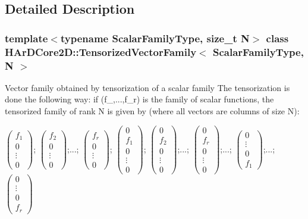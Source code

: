 \subsection{Detailed Description}
\subsubsection*{template$<$typename Scalar\+Family\+Type, size\+\_\+t N$>$\newline
class H\+Ar\+D\+Core2\+D\+::\+Tensorized\+Vector\+Family$<$ Scalar\+Family\+Type, N $>$}

Vector family obtained by tensorization of a scalar family The tensorization is done the following way\+: if (f\+\_,...,f\+\_\+r) is the family of scalar functions, the tensorized family of rank N is given by (where all vectors are columns of size N)\+:

$\left(\begin{array}{c}f_1\\0\\\vdots\\0\end{array}\right)$; $\left(\begin{array}{c}f_2\\0\\\vdots\\0\end{array}\right)$;...; $\left(\begin{array}{c}f_r\\0\\\vdots\\0\end{array}\right)$; $\left(\begin{array}{c}0\\f_1\\0\\\vdots\\0\end{array}\right)$; $\left(\begin{array}{c}0\\f_2\\0\\\vdots\\0\end{array}\right)$;...; $\left(\begin{array}{c}0\\f_r\\0\\\vdots\\0\end{array}\right)$;...; $\left(\begin{array}{c}0\\\vdots\\0\\f_1\end{array}\right)$;...; $\left(\begin{array}{c}0\\\vdots\\0\\f_r\end{array}\right)$

